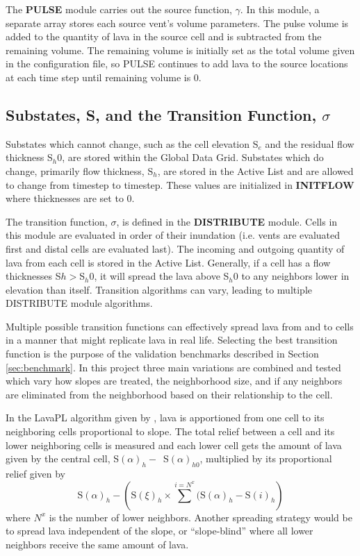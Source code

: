 \documentclass[12pt,letter]{article}
\begin{document}
		The \textbf{PULSE} module carries out the source function, $\gamma$. In this module, a separate array stores each source vent's volume parameters. The pulse volume is added to the quantity of lava in the source cell and is subtracted from the remaining volume. The remaining volume is initially set as the total volume given in the configuration file, so PULSE continues to add lava to the source locations at each time step until remaining volume is 0.
		
	\subsection{Substates, S, and the Transition Function, $\sigma$}
		Substates which cannot change, such as the cell elevation S$_e$ and the residual flow thickness S$_h0$, are stored within the Global Data Grid. Substates which do change, primarily flow thickness, S$_h$, are stored in the Active List and are allowed to change from timestep to timestep. These values are initialized in \textbf{INITFLOW} where thicknesses are set to 0.
		
		The transition function, $\sigma$, is defined in the \textbf{DISTRIBUTE} module. Cells in this module are evaluated in order of their inundation (i.e. vents are evaluated first and distal cells are evaluated last). The incoming and outgoing quantity of lava from each cell is stored in the Active List. Generally, if a cell has a flow thicknesses S$h>$S$_h0$, it will spread the lava above S$_h0$ to any neighbors lower in elevation than itself. Transition algorithms can vary, leading to multiple DISTRIBUTE module algorithms.
		
		
		Multiple possible transition functions can effectively spread lava from and to cells in a manner that might replicate lava in real life. Selecting the best transition function is the purpose of the validation benchmarks described in Section \ref{sec:benchmark}. In this project three main variations are combined and tested which vary how slopes are treated, the neighborhood size, and if any neighbors are eliminated from the neighborhood based on their relationship to the cell.
			
		In the LavaPL algorithm given by \citet{connor2012}, lava is apportioned from one cell to its neighboring cells proportional to slope. The total relief between a cell and its lower neighboring cells is measured and each lower cell gets the amount of lava given by the central cell, S$(\alpha)_h-$~S$(\alpha)_{h0}$, multiplied by its proportional relief given by 
		\begin{equation}
			\mathrm{S}(\alpha)_h-\left(\mathrm{S}(\xi)_h\times\sum^{i=N^x}(\mathrm{S}(\alpha)_h-\mathrm{S}(i)_h\right)
		\end{equation}
		where $N^x$ is the number of lower neighbors. Another spreading strategy would be to spread lava independent of the slope, or ``slope-blind'' where all lower neighbors receive the same amount of lava.
		
\end{document}
